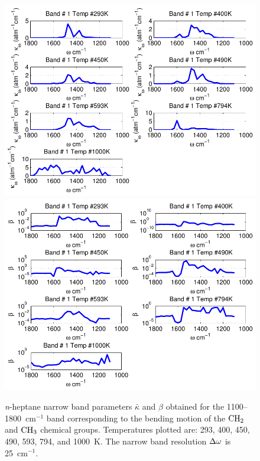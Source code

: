 \begin{figure}[p]
\begin{center}
\includegraphics[width=5.0in]{Figures/Heptane_Kappa_Band1_MALKMUS.pdf}
\includegraphics[width=5.0in]{Figures/Heptane_Beta_Band1_MALKMUS.pdf}
\end{center}
\caption{\textit{n}-heptane narrow band parameters $\bar{\kappa}$ and $\beta$ obtained for the 1100--1800~cm$^{-1}$ band corresponding to the bending motion of the $\rm CH_2$ and $\rm CH_3$ chemical groups. Temperatures plotted are: 293, 400, 450, 490, 593, 794, and 1000~K. The narrow band resolution $\Delta \omega$ is 25~cm$^{-1}$.\label{fig:nheptane_kappa_beta1}}
\end{figure}

